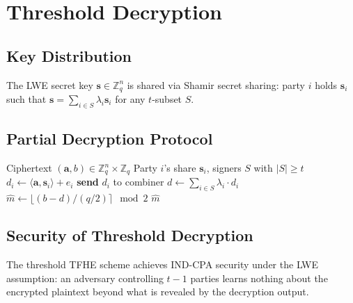 \section{Threshold Decryption}

\label{sec:threshold}

\subsection{Key Distribution}

The LWE secret key $\mathbf{s} \in \mathbb{Z}_q^n$ is shared via Shamir secret sharing:
party $i$ holds $\mathbf{s}_i$ such that $\mathbf{s} = \sum_{i \in S} \lambda_i \mathbf{s}_i$
for any $t$-subset $S$.

\subsection{Partial Decryption Protocol}

\begin{algorithm}[H]
\caption{Threshold TFHE Decryption}
\label{alg:threshold-decrypt}
\begin{algorithmic}[1]
\Require Ciphertext $(\mathbf{a}, b) \in \mathbb{Z}_q^n \times \mathbb{Z}_q$
\Require Party $i$'s share $\mathbf{s}_i$, signers $S$ with $|S| \geq t$
\State {}
\State $d_i \gets \langle \mathbf{a}, \mathbf{s}_i \rangle + e_i$ 
\State \textbf{send} $d_i$ to combiner
\State {}
\State $d \gets \sum_{i \in S} \lambda_i \cdot d_i$ 
\State $\hat{m} \gets \lfloor (b - d) / (q/2) \rceil \mod 2$
\State \Return $\hat{m}$
\end{algorithmic}
\end{algorithm}

\subsection{Security of Threshold Decryption}

\begin{theorem}
\label{thm:threshold-security}
The threshold TFHE scheme achieves IND-CPA security under the LWE assumption: an
adversary controlling $t-1$ parties learns nothing about the encrypted plaintext
beyond what is revealed by the decryption output.
\end{theorem}

